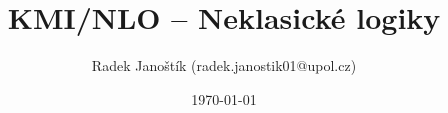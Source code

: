 \documentclass[10pt, a4paper, titlepage]{article}
\title{KMI/NLO  -- Neklasické logiky}
\author{\normalsize{Radek Janoštík (radek.janostik01@upol.cz)}}
\date{\today}
\theoremstyle{note}
\begin{document}
\maketitle


\renewcommand{\indexcolumns}{3}
\printindex
\end{document}
